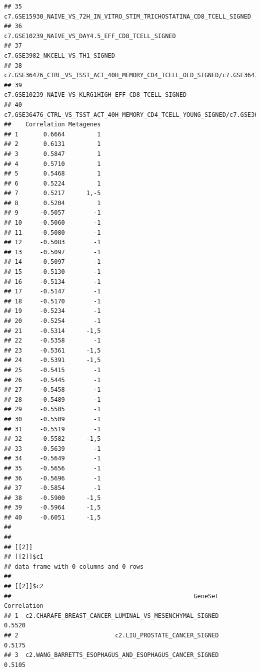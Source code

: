 \documentclass{article}\usepackage[]{graphicx}\usepackage[]{color}
\makeatletter
\newenvironment{kframe}{%
 \def\at@end@of@kframe{}%
 \ifinner\ifhmode%
  \def\at@end@of@kframe{\end{minipage}}%
  \begin{minipage}{\columnwidth}%
 \fi\fi%
 \def\FrameCommand##1{\hskip\@totalleftmargin \hskip-\fboxsep
 \colorbox{shadecolor}{##1}\hskip-\fboxsep
     \hskip-\linewidth \hskip-\@totalleftmargin \hskip\columnwidth}%
 \MakeFramed {\advance\hsize-\width
   \@totalleftmargin\z@ \linewidth\hsize
   \@setminipage}}%
 {\par\unskip\endMakeFramed%
 \at@end@of@kframe}
\newenvironment{knitrout}{}{} %
\makeatother
\begin{document}
\begin{knitrout}
\begin{kframe}
\begin{verbatim}
## 35                                                                                                              c7.GSE15930_NAIVE_VS_72H_IN_VITRO_STIM_TRICHOSTATINA_CD8_TCELL_SIGNED
## 36                                                                                                                                   c7.GSE10239_NAIVE_VS_DAY4.5_EFF_CD8_TCELL_SIGNED
## 37                                                                                                                                                    c7.GSE3982_NKCELL_VS_TH1_SIGNED
## 38                                                          c7.GSE36476_CTRL_VS_TSST_ACT_40H_MEMORY_CD4_TCELL_OLD_SIGNED/c7.GSE36476_CTRL_VS_TSST_ACT_72H_MEMORY_CD4_TCELL_OLD_SIGNED
## 39                                                                                                                                c7.GSE10239_NAIVE_VS_KLRG1HIGH_EFF_CD8_TCELL_SIGNED
## 40                                                      c7.GSE36476_CTRL_VS_TSST_ACT_40H_MEMORY_CD4_TCELL_YOUNG_SIGNED/c7.GSE36476_CTRL_VS_TSST_ACT_72H_MEMORY_CD4_TCELL_YOUNG_SIGNED
##    Correlation Metagenes
## 1       0.6664         1
## 2       0.6131         1
## 3       0.5847         1
## 4       0.5710         1
## 5       0.5468         1
## 6       0.5224         1
## 7       0.5217      1,-5
## 8       0.5204         1
## 9      -0.5057        -1
## 10     -0.5060        -1
## 11     -0.5080        -1
## 12     -0.5083        -1
## 13     -0.5097        -1
## 14     -0.5097        -1
## 15     -0.5130        -1
## 16     -0.5134        -1
## 17     -0.5147        -1
## 18     -0.5170        -1
## 19     -0.5234        -1
## 20     -0.5254        -1
## 21     -0.5314      -1,5
## 22     -0.5358        -1
## 23     -0.5361      -1,5
## 24     -0.5391      -1,5
## 25     -0.5415        -1
## 26     -0.5445        -1
## 27     -0.5458        -1
## 28     -0.5489        -1
## 29     -0.5505        -1
## 30     -0.5509        -1
## 31     -0.5519        -1
## 32     -0.5582      -1,5
## 33     -0.5639        -1
## 34     -0.5649        -1
## 35     -0.5656        -1
## 36     -0.5696        -1
## 37     -0.5854        -1
## 38     -0.5900      -1,5
## 39     -0.5964      -1,5
## 40     -0.6051      -1,5
## 
## 
## [[2]]
## [[2]]$c1
## data frame with 0 columns and 0 rows
## 
## [[2]]$c2
##                                                   GeneSet Correlation
## 1  c2.CHARAFE_BREAST_CANCER_LUMINAL_VS_MESENCHYMAL_SIGNED      0.5520
## 2                           c2.LIU_PROSTATE_CANCER_SIGNED      0.5175
## 3  c2.WANG_BARRETTS_ESOPHAGUS_AND_ESOPHAGUS_CANCER_SIGNED      0.5105

\end{verbatim}
\end{kframe}
\end{knitrout}
\end{document}
